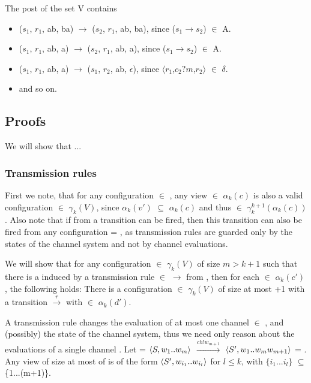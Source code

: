 The post of the set V contains
\begin{itemize}
\item
($s_1$, $r_1$, ab, ba) $\rightarrow$ ($s_2$, $r_1$, ab, ba), since ($s_1$$\rightarrow$$s_2$) $\in$ A.
\item
($s_1$, $r_1$, ab, a) $\rightarrow$ ($s_2$, $r_1$, ab, a), since ($s_1$$\rightarrow$$s_2$) $\in$ A.
\item
($s_1$, $r_1$, ab, a) $\rightarrow$ ($s_1$, $r_2$, ab, $\epsilon$), since $\langle$$r_1$,$c_2?m$,$r_2$$\rangle$ $\in$ $\delta$.
\item
and so on.
\end{itemize}

\subsection{Proofs}
We will show that ...

\subsubsection{Transmission rules}
First we note, that for any configuration  $\in$ , any view  $\in$ $\alpha_k(c)$ is also a valid configuration  $\in$ $\gamma_k(V)$, since $\alpha_k(v')$ $\subseteq$ $\alpha_k(c)$ and thus  $\in$ $\gamma_k^{k+1}(\alpha_k(c))$. Also note that if from  a transition  can be fired, then this transition can also be fired from any configuration  = , as transmission rules are guarded only by the states of the channel system and not by channel evaluations.

We will show that for any configuration  $\in$ $\gamma_k(V)$ of size $m > k + 1$ such that there is a  induced by a transmission rule  $\in$ $\rightarrow$ from , then for each  $\in$ $\alpha_k(c')$, the following holds: There is a configuration  $\in$ $\gamma_k(V)$ of size at most +1 with a transition  $\xrightarrow{r}$  with  $\in$ $\alpha_k(d')$.

A transmission rule changes the evaluation of at most one channel  $\in$ , and (possibly) the state of the channel system, thus we need only reason about the evaluations of a single channel .
Let  = $\langle S, w_1..w_m\rangle$ $\xrightarrow{ch!w_{m+1}}$ $\langle S', w_1..w_mw_{m+1}\rangle$ = . Any view  of size at most  of  is of the form $\langle S',w_{i_1}..w_{i_l}\rangle$ for $l \leq k$, with $\{i_1...i_l\}$ $\subseteq$ \{1...(m+1)\}.

